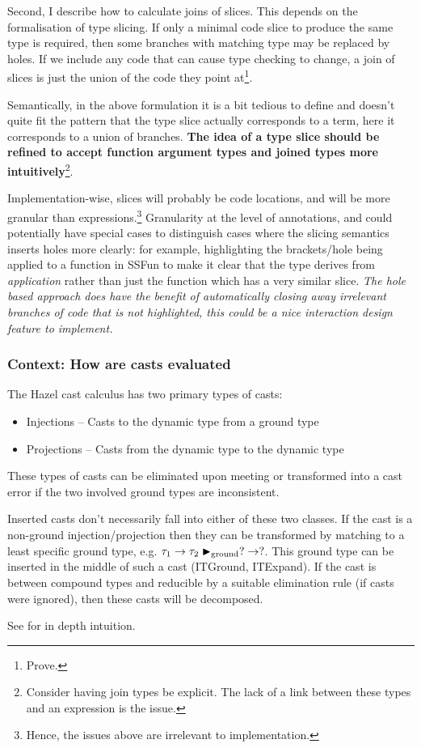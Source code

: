 Second, I describe how to calculate joins of slices. This depends on the formalisation of type slicing. If only a minimal code slice to produce the same type is required, then some branches with matching type may be replaced by holes. If we include any code that can cause type checking to change, a join of slices is just the union of the code they point at\footnote{Prove.}.\par Semantically, in the above formulation it is a bit tedious to define and doesn't quite fit the pattern that the type slice actually corresponds to a term, here it corresponds to a union of branches. \textbf{The idea of a type slice should be refined to accept function argument types and joined types more intuitively}\footnote{Consider having join types be explicit. The lack of a link between these types and an expression is the issue.}.
\par 
Implementation-wise, slices will probably be code locations, and will be more granular than expressions.\footnote{Hence, the issues above are irrelevant to implementation.} Granularity at the level of annotations, and could potentially have special cases to distinguish cases where the slicing semantics inserts holes more clearly: for example, highlighting the brackets/hole being applied to a function in SSFun to make it clear that the type derives from \textit{application} rather than just the function which has a very similar slice. \textit{The hole based approach does have the benefit of automatically closing away irrelevant branches of code that is not highlighted, this could be a nice interaction design feature to implement.}

\subsubsection{Context: How are casts evaluated}
The Hazel cast calculus has two primary types of casts:
\begin{itemize}
\item Injections -- Casts to the dynamic type from a ground type
\item Projections -- Casts from the dynamic type to the dynamic type
\end{itemize}
These types of casts can be eliminated upon meeting or transformed into a cast error if the two involved ground types are inconsistent.\par 
Inserted casts don't necessarily fall into either of these two classes. If the cast is a non-ground injection/projection then they can be transformed by matching to a least specific ground type, e.g. $\tau_1 \to \tau_2 \blacktriangleright_{\text{ground}} ? \to ?$. This ground type can be inserted in the middle of such a cast (ITGround, ITExpand). If the cast is between compound types and reducible by a suitable elimination rule (if casts were ignored), then these casts will be decomposed. \par 
See \cite{GradualizerDynamic} for in depth intuition.

